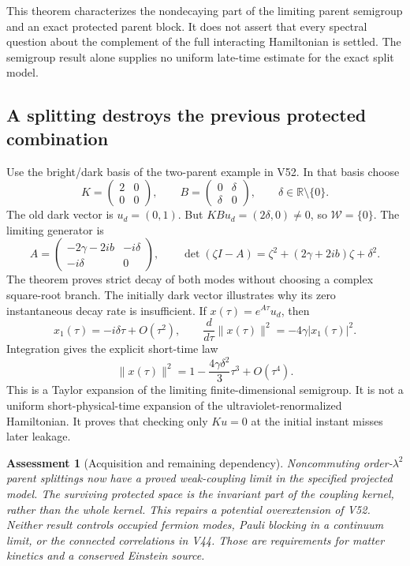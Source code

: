\documentclass[11pt]{article}
\newtheorem{assessment}[theorem]{Assessment}
\theoremstyle{remark}
\begin{document}
This theorem characterizes the nondecaying part of the
limiting parent semigroup and an exact protected parent block.
It does not assert that every spectral question about the
complement of the full interacting Hamiltonian is settled.
The semigroup result alone supplies no uniform late-time
estimate for the exact split model.

\subsection{A splitting destroys the previous protected combination}

Use the bright/dark basis of the two-parent example in V52.
In that basis choose
\[
 K=\begin{pmatrix}2&0\\0&0\end{pmatrix},\qquad
 B=\begin{pmatrix}0&\delta\\\delta&0\end{pmatrix},
 \qquad \delta\in\mathbb R\setminus\{0\}.
\]
The old dark vector is \(u_d=(0,1)\).  But
\(KBu_d=(2\delta,0)\ne0\), so \(\mathcal W=\{0\}\).
The limiting generator is
\[
 A=\begin{pmatrix}
 -2\gamma-2ib&-i\delta\\-i\delta&0
 \end{pmatrix},\qquad
 \det(\zeta I-A)=\zeta^2+(2\gamma+2ib)\zeta+\delta^2.
\]
The theorem proves strict decay of both modes without choosing
a complex square-root branch.  The initially dark vector
illustrates why its zero instantaneous decay rate is insufficient.
If \(x(\tau)=e^{A\tau}u_d\), then
\[
 x_1(\tau)=-i\delta\tau+O(\tau^2),\qquad
 \frac{d}{d\tau}\|x(\tau)\|^2=-4\gamma|x_1(\tau)|^2.
\]
Integration gives the explicit short-time law
\[
 \|x(\tau)\|^2
       =1-\frac{4\gamma\delta^2}{3}\tau^3+O(\tau^4).
\]
This is a Taylor expansion of the limiting finite-dimensional
semigroup.  It is not a uniform short-physical-time expansion of
the ultraviolet-renormalized Hamiltonian.  It proves that checking
only \(Ku=0\) at the initial instant misses later leakage.

\begin{assessment}[Acquisition and remaining dependency]
\label{ass:v20v53}
Noncommuting order-\(\lambda^2\) parent splittings now have a
proved weak-coupling limit in the specified projected model.
The surviving protected space is the invariant part of the
coupling kernel, rather than the whole kernel.  This repairs
a potential overextension of V52.  Neither result controls
occupied fermion modes, Pauli blocking in a continuum limit,
or the connected correlations in V44.  Those are requirements
for matter kinetics and a conserved Einstein source.
\end{assessment}
\end{document}
